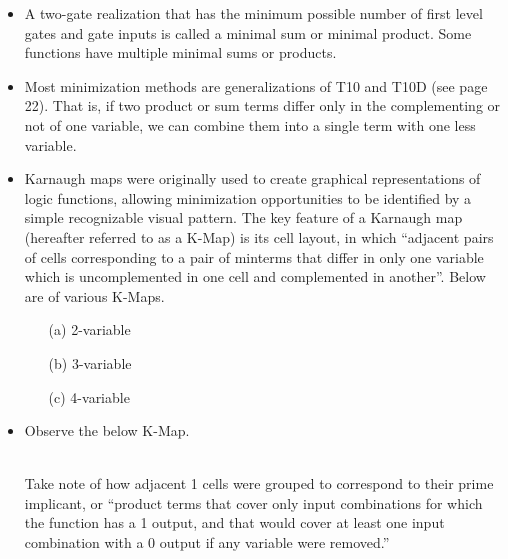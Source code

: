 \documentclass[10pt,a4paper]{article}
\begin{document}
\begin{itemize}
\begin{enumerate}
\end{enumerate}
\item A two-gate realization that has the minimum possible number of first level gates and gate inputs is called a minimal sum or minimal product. Some functions have multiple minimal sums or products. 
\item Most minimization methods are generalizations of T10 and T10D (see page 22). That is, if two product or sum terms differ only in the complementing or not of one variable, we can combine them into a single term with one less variable. 
\item Karnaugh maps were originally used to create graphical representations of logic functions, allowing minimization opportunities to be identified by a simple recognizable visual pattern. The key feature of a Karnaugh map (hereafter referred to as a K-Map) is its cell layout, in which ``adjacent pairs of cells corresponding to a pair of minterms that differ in only one variable which is uncomplemented in one cell and complemented in another''. Below are of various K-Maps. 
\begin{enumerate}
\item [(a)] 2-variable\\
\item [(b)] 3-variable\\
\item [(c)] 4-variable\\
\end{enumerate}
\item Observe the below K-Map.\\
\\
Take note of how adjacent 1 cells were grouped to correspond to their prime implicant, or ``product terms that cover only input combinations for which the function has a 1 output, and that would cover at least one input combination with a 0 output if any variable were removed.''
\end{itemize}
\pagebreak
\end{document}
